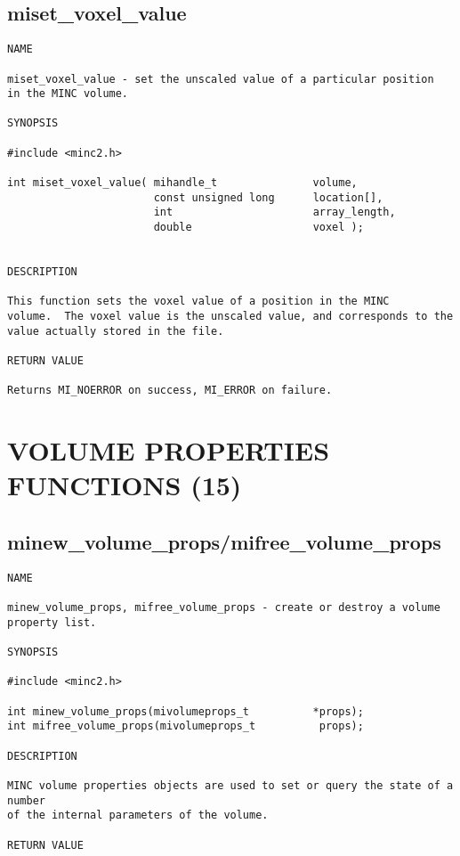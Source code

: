 \documentclass{article}
\begin{document}
\subsection{miset\_voxel\_value}
\begin{verbatim}
NAME

miset_voxel_value - set the unscaled value of a particular position
in the MINC volume.

SYNOPSIS

#include <minc2.h>

int miset_voxel_value( mihandle_t               volume,
                       const unsigned long      location[],
                       int                      array_length,
                       double                   voxel );


DESCRIPTION

This function sets the voxel value of a position in the MINC
volume.  The voxel value is the unscaled value, and corresponds to the
value actually stored in the file.

RETURN VALUE

Returns MI_NOERROR on success, MI_ERROR on failure.
\end{verbatim}

\section{VOLUME PROPERTIES FUNCTIONS (15)}
\subsection{minew\_volume\_props/mifree\_volume\_props}
\begin{verbatim}
NAME

minew_volume_props, mifree_volume_props - create or destroy a volume
property list.

SYNOPSIS

#include <minc2.h>

int minew_volume_props(mivolumeprops_t          *props);
int mifree_volume_props(mivolumeprops_t          props);

DESCRIPTION

MINC volume properties objects are used to set or query the state of a number
of the internal parameters of the volume.

RETURN VALUE
\end{verbatim}
\end{document}
